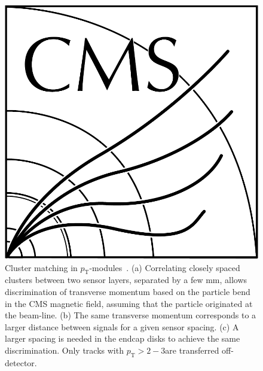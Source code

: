 \begin{figure}[!h]
\centering
\includegraphics[width=5in]{CMS-bw-logo.pdf}
\caption{Cluster matching in $p_\mathrm{T}$-modules~\cite{P2TrackerTDR}. (a) Correlating closely spaced clusters between two sensor layers, separated by a few mm, allows discrimination of transverse momentum based on the particle bend in the CMS magnetic field, assuming that the particle originated at the beam-line. (b) The same transverse momentum corresponds to a larger distance between signals for a given sensor spacing. (c) A larger spacing is needed in the endcap disks to achieve the same discrimination. Only tracks with $p_{\mathrm{T}}>2-3$\GeVc are transferred off-detector.
}
\label{stubs}
\end{figure}
